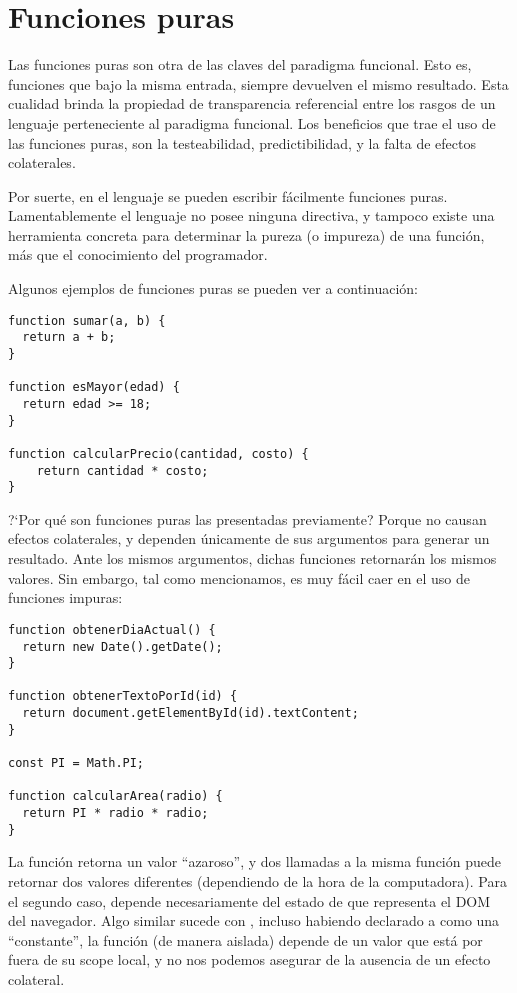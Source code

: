 \section{Funciones puras}

Las funciones puras son otra de las claves del paradigma funcional. Esto es, funciones que bajo la misma entrada, siempre devuelven el mismo resultado. Esta cualidad brinda la propiedad de transparencia referencial entre los rasgos de un lenguaje perteneciente al paradigma funcional. Los beneficios que trae el uso de las funciones puras, son la testeabilidad, predictibilidad, y la falta de efectos colaterales.

Por suerte, en el lenguaje se pueden escribir fácilmente funciones puras. Lamentablemente el lenguaje no posee ninguna directiva, y tampoco existe una herramienta concreta para determinar la pureza (o impureza) de una función, más que el conocimiento del programador.

Algunos ejemplos de funciones puras se pueden ver a continuación:

\begin{lstlisting}[title={Funciones puras}]
function sumar(a, b) {
  return a + b;
}

function esMayor(edad) {
  return edad >= 18;
}

function calcularPrecio(cantidad, costo) {
	return cantidad * costo;
}
\end{lstlisting}

?`Por qué son funciones puras las presentadas previamente? Porque no causan efectos colaterales, y dependen únicamente de sus argumentos para generar un resultado. Ante los mismos argumentos, dichas funciones retornarán los mismos valores. Sin embargo, tal como mencionamos, es muy fácil caer en el uso de funciones impuras:

\begin{lstlisting}[title={Funciones impuras}]
function obtenerDiaActual() {
  return new Date().getDate();
}

function obtenerTextoPorId(id) {
  return document.getElementById(id).textContent;
}

const PI = Math.PI;

function calcularArea(radio) {
  return PI * radio * radio;
}
\end{lstlisting}

La función  retorna un valor "`azaroso"', y dos llamadas a la misma función puede retornar dos valores diferentes (dependiendo de la hora de la computadora). Para el segundo caso,  depende necesariamente del estado de  que representa el DOM del navegador. Algo similar sucede con , incluso habiendo declarado a  como una "`constante"', la función (de manera aislada) depende de un valor que está por fuera de su scope local, y no nos podemos asegurar de la ausencia de un efecto colateral.

